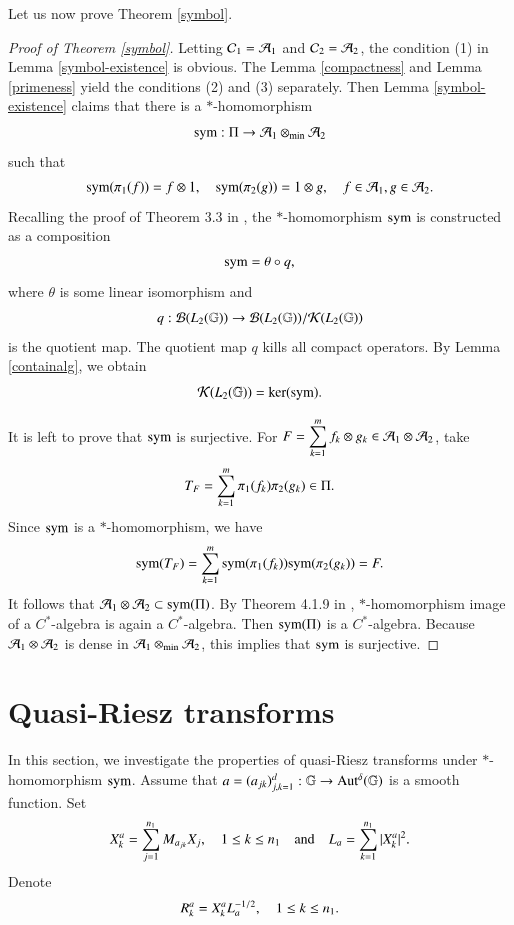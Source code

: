 \documentclass[leqno]{amsart}
\begin{document}
	Let us now prove Theorem \ref{symbol}.
	\begin{proof}[Proof of Theorem \ref{symbol}]
		
		Letting ${\mathcal C}_{1}={\mathcal A}_{1}$ and ${\mathcal C}_{2}={\mathcal A}_{2}$, the condition (1) in Lemma \ref{symbol-existence} is obvious.
		The Lemma \ref{compactness} and Lemma \ref{primeness} yield the conditions (2) and (3) separately. Then Lemma \ref{symbol-existence} claims that there is a $*$-homomorphism $${\rm sym}:\Pi\rightarrow{\mathcal A}_{1}\otimes_{\rm min}{\mathcal A}_{2}$$ such that
		\begin{align*}
			{\rm sym}(\pi_{1}(f))=f\otimes1,\quad{\rm sym}(\pi_{2}(g))=1\otimes g,\quad f\in{\mathcal A}_{1},g\in{\mathcal A}_{2}.
		\end{align*}
		Recalling the proof of Theorem 3.3 in \cite{DAO2}, the $*$-homomorphism ${\rm sym}$ is constructed as a composition
		\begin{align*}
			{\rm sym}=\theta\circ q,
		\end{align*}
		where $\theta$ is some linear isomorphism and $$q:{\mathcal B}(L_{2}(\mathbb{G}))\rightarrow{\mathcal B}(L_{2}(\mathbb{G}))/{\mathcal K}(L_{2}(\mathbb{G}))$$ is the quotient map. The quotient map $q$ kills all compact operators.
		By Lemma \ref{containalg}, we obtain $${\mathcal K}(L_{2}(\mathbb{G}))=\ker({\rm sym}).$$
		
		It is left to prove that ${\rm sym}$ is surjective. 
		For $\displaystyle F=\sum_{k=1}^{m}f_{k}\otimes g_{k}\in{\mathcal A}_{1}\otimes{\mathcal A}_{2}$, take
		\begin{align*}
			T_{F}=\sum_{k=1}^{m}\pi_{1}(f_{k})\pi_{2}(g_{k})\in\Pi.
		\end{align*}
		Since ${\rm sym}$ is a $*$-homomorphism, we have
		\begin{align*}
			{\rm sym}(T_{F})=\sum_{k=1}^{m}{\rm sym}(\pi_{1}(f_{k})){\rm sym}(\pi_{2}(g_{k}))=F.
		\end{align*}
		It follows that ${\mathcal A}_{1}\otimes{\mathcal A}_{2}\subset{\rm sym}(\Pi)$.
		By Theorem 4.1.9 in \cite{Kadison-Ringrose-book}, $*$-homomorphism image of a $C^{*}$-algebra is again a $C^{*}$-algebra. Then ${\rm sym}(\Pi)$ is a $C^{*}$-algebra. Because ${\mathcal A}_{1}\otimes{\mathcal A}_{2}$ is dense in ${\mathcal A}_{1}\otimes_{\rm min}{\mathcal A}_{2}$, this implies that ${\rm sym}$ is surjective.
	\end{proof}
	
	
	
	
	
	
	
	\section{Quasi-Riesz transforms}\label{quasi-Riesz-transform}
	
	In this section, we investigate the properties of quasi-Riesz transforms under $*$-homomorphism ${\rm sym}$. 
	Assume that $a=(a_{jk})_{j,k=1}^{d}:\mathbb{G}\rightarrow{\rm Aut^{\delta}}(\mathbb{G})$ is a smooth function. Set
	\begin{align*}
		X_{k}^{a}=\sum_{j=1}^{n_{1}}M_{a_{jk}}X_{j},\quad1\leq k\leq n_{1}\quad{\rm and}\quad L_{a}=\sum_{k=1}^{n_{1}}|X_{k}^{a}|^{2}.
	\end{align*}
	Denote
	\begin{align}\label{quasi-Riesz}
		{ R}^{a}_{k}=X_{k}^{a}L_{a}^{-1/2},\quad1\leq k\leq n_{1}.
	\end{align}
	
\end{document}
